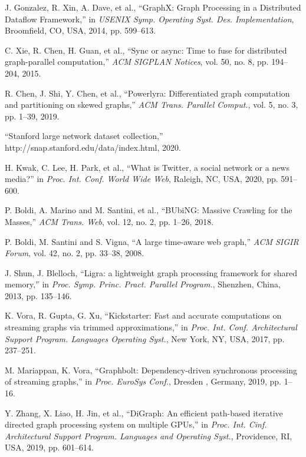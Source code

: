 \documentclass[lettersize,journal]{IEEEtran}
\begin{document}
\begin{thebibliography}{100}
J. Gonzalez, R. Xin, A. Dave, et al., ``{GraphX}: Graph Processing in a Distributed Dataflow Framework,'' in \textit{USENIX Symp. Operating Syst. Des. Implementation}, Broomfield, CO, USA, 2014, pp. 599--613.

C. Xie, R. Chen, H. Guan, et al., ``Sync or async: Time to fuse for distributed graph-parallel computation,'' \textit{ACM SIGPLAN Notices}, vol. 50, no. 8, pp. 194--204, 2015.

R. Chen, J. Shi, Y. Chen, et al., ``Powerlyra: Differentiated graph computation and partitioning on skewed graphs,'' \textit{ACM Trans. Parallel Comput.}, vol. 5, no. 3, pp. 1--39, 2019.

``Stanford large network dataset collection,'' http://snap.stanford.edu/data/index.html, 2020.

H. Kwak, C. Lee, H. Park, et al., ``What is Twitter, a social network or a news media?'' in \textit{Proc. Int. Conf. World Wide Web}, Raleigh, NC, USA, 2020, pp. 591--600.

P. Boldi, A. Marino and M. Santini, et al.,  ``BUbiNG: Massive Crawling for the Masses,''  \textit{ACM Trans. Web}, vol. 12, no. 2, pp. 1--26, 2018.

P. Boldi, M. Santini and S. Vigna,  ``A large time-aware web graph,''  \textit{ACM SIGIR Forum}, vol. 42, no. 2, pp. 33--38, 2008.

J. Shun, J. Blelloch, ``Ligra: a lightweight graph processing framework for shared memory,'' in \textit{Proc. Symp. Princ. Pract. Parallel Program.}, Shenzhen, China, 2013, pp. 135--146.

K. Vora, R. Gupta, G. Xu, ``Kickstarter: Fast and accurate computations on streaming graphs via trimmed approximations,'' in \textit{Proc. Int. Conf. Architectural Support Program. Languages Operating Syst.}, New York, NY, USA, 2017, pp. 237--251.

M. Mariappan, K. Vora, ``Graphbolt: Dependency-driven synchronous processing of streaming graphs,'' in \textit{Proc. EuroSys Conf.}, Dresden , Germany, 2019, pp. 1--16.

Y. Zhang, X. Liao, H. Jin, et al., ``DiGraph: An efficient path-based iterative directed graph processing system on multiple GPUs,'' in \textit{Proc. Int. Cinf. Architectural Support Program. Languages and Operating Syst.}, Providence, RI, USA, 2019, pp. 601--614.


\end{thebibliography}
\end{document}
